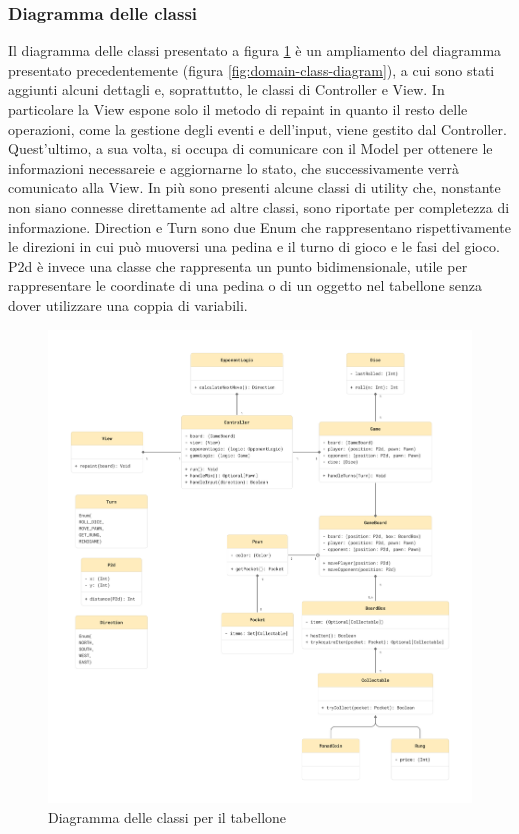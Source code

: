 \subsubsection{Diagramma delle classi} \label{sec:design-choices:class-diagram}
Il diagramma delle classi presentato a figura \ref{fig:class-diagram} è un ampliamento del diagramma presentato precedentemente
(figura \ref{fig:domain-class-diagram}), a cui sono stati aggiunti alcuni dettagli e, soprattutto, le classi di Controller e View.
In particolare la View espone solo il metodo di repaint in quanto il resto delle operazioni, come la gestione degli eventi e dell'input,
viene gestito dal Controller. Quest'ultimo, a sua volta, si occupa di comunicare con il Model per ottenere le informazioni necessareie
e aggiornarne lo stato, che successivamente verrà comunicato alla View. In più sono presenti alcune classi di utility che, nonstante
non siano connesse direttamente ad altre classi, sono riportate per completezza di informazione. Direction e Turn sono due Enum che
rappresentano rispettivamente le direzioni in cui può muoversi una pedina e il turno di gioco e le fasi del gioco. P2d è invece una classe
che rappresenta un punto bidimensionale, utile per rappresentare le coordinate di una pedina o di un oggetto nel tabellone senza 
dover utilizzare una coppia di variabili.
\begin{figure}[ht!]
    \centering
    \includegraphics[width=\textwidth]{figures/ClassDiagram_ScalaParty.png}
    \caption{Diagramma delle classi per il tabellone}
    \label{fig:class-diagram}
\end{figure}
